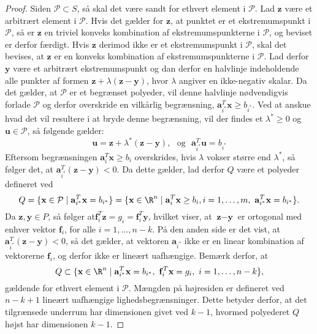 \begin{proof}
Siden $\mathcal{P} \subset S$, så skal det være sandt for ethvert element i $\mathcal{P}$.
Lad $\textbf{z}$ være et arbitrært element i $\mathcal{P}$. 
Hvis det gælder for $\textbf{z}$, at punktet er et ekstremumspunkt i $\mathcal{P}$, så er $\textbf{z}$ en triviel konveks kombination af ekstremumspunkterne i $\mathcal{P}$, og beviset er derfor færdigt. 
Hvis $\textbf{z}$ derimod ikke er et ekstremumspunkt i $\mathcal{P}$, skal det bevises, at $\textbf{z}$ er en konveks kombination af ekstremumspunkterne i $\mathcal{P}$. 
Lad derfor $\textbf{y}$ være et arbitrært ekstremumspunkt og dan derfor en halvlinje indeholdende alle punkter af formen $\textbf{z}+\lambda(\textbf{z}-\textbf{y})$, hvor $\lambda$ angiver en ikke-negativ skalar. 
Da det gælder, at $\mathcal{P}$ er et begrænset polyeder, vil denne halvlinje nødvendigvis forlade $\mathcal{P}$ og derfor overskride en vilkårlig begrænsning, $\mathbf{a}_{i^*}^T \textbf{x} \geq b_{i^*}$. 
Ved at anskue hvad det vil resultere i at bryde denne begrænsning, vil der findes et $\lambda^* \geq 0$ og $\textbf{u} \in \mathcal{P}$, så følgende gælder: 
$$\textbf{u}=\textbf{z}+\lambda^* (\textbf{z}-\textbf{y}), \text{     } \text{og} \text{      } \mathbf{a}_{i^*}^T \textbf{u} = b_{i^*} $$
Eftersom begrænsningen $\mathbf{a}_{i}^{T} \textbf{x} \geq b_i$ overskrides, hvis $\lambda$ vokser større end $\lambda^*$, så følger det, at $\mathbf{a}_{i^*}^{T}(\textbf{z}-\textbf{y}) <0.$ 
Da dette gælder, lad derfor $Q$ være et polyeder defineret ved 
$$Q=\{\textbf{x} \in \mathcal{P} \mid \mathbf{a}_{i^*}^{T} \textbf{x} =b_{i^*}\} = \{\textbf{x} \in \R^n \mid \mathbf{a}_{i}^{T} \textbf{x} \geq b_{i}, i=1,\ldots,m, \text{   } \mathbf{a}_{i^*}^{T} \textbf{x} =b_{i^*}\}.$$
Da $\textbf{z},\textbf{y} \in P$, så følger at$\mathbf{f}_{i}^{T}\textbf{z}=g_i=\mathbf{f}_{i}^{T}\textbf{y}$, hvilket viser, at $\textbf{z}-\textbf{y}$ er ortogonal med enhver vektor $\mathbf{f}_{i}$, for alle $i=1,\ldots,n-k$. 
På den anden side er det vist, at $\mathbf{a}_{i^*}^{T}(\textbf{z}-\textbf{y}) <0$, så det gælder, at vektoren  $\mathbf{a}_{i^*}$ ikke er en linear kombination af vektorerne $\mathbf{f}_{i}$, og derfor ikke er lineært uafhængige. 
Bemærk derfor, at \\
$$Q \subset \{\textbf{x} \in \R^n \mid \mathbf{a}_{i^*}^{T} \textbf{x}=b_{i^*}, \text{  } \mathbf{f}_{i}^{T}\textbf{x}=g_i, \text{  } i=1,\ldots,n-k\},$$ 
gældende for ethvert element i $\mathcal{P}$. 
Mængden på højresiden er defineret ved $n-k+1$ lineært uafhængige lighedsbegrænsninger. 
Dette betyder derfor, at det tilgrænsede underrum har dimensionen givet ved $k-1$, hvormed polyederet $Q$ højst har dimensionen $k-1$. 

\end{proof}
